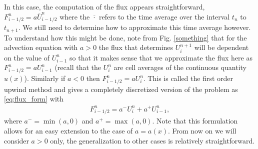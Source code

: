 In this case, the computation of the flux appears straightforward, $F_{i-1/2}^n = a\overline{U}^n_{i-1/2}$ where the $\overline{\cdot}$ refers to the time average over the interval $t_n$ to $t_{n+1}$.  We still need to determine how to approximate this time average however.  To understand how this might be done, note from Fig. \ref{something} that for the advection equation with $a>0$ the flux that determines $U_i^{n+1}$ will be dependent on the value of $U_{i-1}^n$ so that it makes sense that we approximate the flux here as $F_{i-1/2}^n = aU_{i-1}^n$ (recall that the $U_i^n$ are cell averages of the continuous quantity $u(x)$).  Similarly if $a<0$ then $F_{i-1/2}^n = aU_{i}^n$.  This is called the first order upwind method and gives a completely discretized version of the problem as \eqref{eq:flux_form} with
\begin{gather}
F_{i-1/2}^n = a^- U_i^n + a^+U_{i-1}^n,
\end{gather}
where $a^- = \min (a,0)$ and $a^+ = \max (a,0)$.  Note that this formulation allows for an easy extension to the case of $a=a(x)$.  From now on we will consider $a>0$ only, the generalization to other cases is relatively straightforward.

